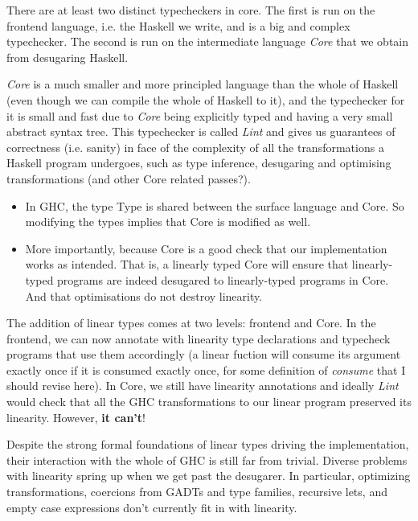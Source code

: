 \documentclass[a4paper, draft]{article}
\begin{document}
There are at least two distinct typecheckers in core. The first is run on the frontend
language, i.e. the Haskell we write, and is a big and complex typechecker. The
second is run on the intermediate language \emph{Core} that we obtain from
desugaring Haskell.

\emph{Core} is a much smaller and more principled language than the whole of
Haskell (even though we can compile the whole of Haskell to it), and the
typechecker for it is small and fast due to \emph{Core} being explicitly typed
and having a very small abstract syntax tree. This typechecker is called
\emph{Lint} and gives us guarantees of correctness (i.e. sanity) in face of
the complexity of all the transformations a Haskell program undergoes, such as
type inference, desugaring and optimising transformations (and other Core
related passes?).

\begin{itemize}
    \item In GHC, the type Type is shared between the surface language and Core.
        So modifying the types implies that Core is modified as well. 

    \item More importantly, because Core is a good check that our implementation
        works as intended. That is, a linearly typed Core will ensure that
        linearly-typed programs are indeed desugared to linearly-typed programs
        in Core. And that optimisations do not destroy linearity.
\end{itemize}

The addition of linear types comes at two levels: frontend and Core.
In the frontend, we can now annotate with linearity type declarations and
typecheck programs that use them accordingly (a linear fuction will consume its
argument exactly once if it is consumed exactly once, for some definition of
\emph{consume} that I should revise here). In Core, we still have linearity
annotations and ideally \emph{Lint} would check that all the GHC transformations
to our linear program preserved its linearity. However, \textbf{it can't}!

Despite the strong formal foundations of linear types driving the
implementation, their interaction with the whole of GHC is still far from
trivial. Diverse problems with linearity spring up when we get past the
desugarer. In particular, optimizing transformations, coercions from GADTs and
type families, recursive lets, and empty case expressions don't currently fit in
with linearity.
\end{document}
